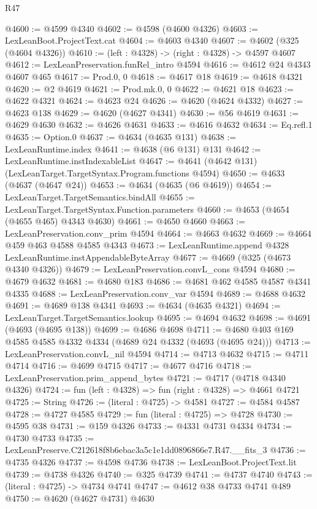 \begin{lexlean}{R47}
\begin{coremodule}
@4600 := @4599 @4340
@4602 := @4598 (@4600 @4326)
@4603 := LexLeanBoot.ProjectText.cat
@4604 := @4603 @4340
@4607 := @4602 (@325 (@4604 @4326))
@4610 := (left : @4328) -> (right : @4328) -> @4597 @4607
@4612 := LexLeanPreservation.funRel_intro @4594
@4616 := @4612 @24 @4343 @4607 @465
@4617 := Prod.{0, 0}
@4618 := @4617 @18
@4619 := @4618 @4321
@4620 := @2 @4619
@4621 := Prod.mk.{0, 0}
@4622 := @4621 @18
@4623 := @4622 @4321
@4624 := @4623 @24
@4626 := @4620 (@4624 @4332)
@4627 := @4623 @138
@4629 := @4620 (@4627 @4341)
@4630 := @56 @4619
@4631 := @4629 @4630
@4632 := @4626 @4631
@4633 := @4616 @4632
@4634 := Eq.refl.{1}
@4635 := Option.{0}
@4637 := @4634 (@4635 @131)
@4638 := LexLeanRuntime.index
@4641 := @4638 (@6 @131) @131
@4642 := LexLeanRuntime.instIndexableList
@4647 := @4641 (@4642 @131) (LexLeanTarget.TargetSyntax.Program.functions @4594)
@4650 := @4633 (@4637 (@4647 @24))
@4653 := @4634 (@4635 (@6 @4619))
@4654 := LexLeanTarget.TargetSemantics.bindAll
@4655 := LexLeanTarget.TargetSyntax.Function.parameters
@4660 := @4653 (@4654 (@4655 @465) @4343 @4630)
@4661 := @4650 @4660
@4663 := LexLeanPreservation.conv_prim @4594
@4664 := @4663 @4632
@4669 := @4664 @459 @463 @4588 @4585 @4343
@4673 := LexLeanRuntime.append @4328 LexLeanRuntime.instAppendableByteArray
@4677 := @4669 (@325 (@4673 @4340 @4326))
@4679 := LexLeanPreservation.convL_cons @4594
@4680 := @4679 @4632
@4681 := @4680 @183
@4686 := @4681 @462 @4585 @4587 @4341 @4335
@4688 := LexLeanPreservation.conv_var @4594
@4689 := @4688 @4632
@4691 := @4689 @138 @4341
@4693 := @4634 (@4635 @4321)
@4694 := LexLeanTarget.TargetSemantics.lookup
@4695 := @4694 @4632
@4698 := @4691 (@4693 (@4695 @138))
@4699 := @4686 @4698
@4711 := @4680 @403 @169 @4585 @4585 @4332 @4334 (@4689 @24 @4332 (@4693 (@4695 @24)))
@4713 := LexLeanPreservation.convL_nil @4594
@4714 := @4713 @4632
@4715 := @4711 @4714
@4716 := @4699 @4715
@4717 := @4677 @4716
@4718 := LexLeanPreservation.prim_append_bytes
@4721 := @4717 (@4718 @4340 @4326)
@4724 := fun (left : @4328) => fun (right : @4328) => @4661 @4721
@4725 := String
@4726 := (literal : @4725) -> @4581
@4727 := @4584 @4587
@4728 := @4727 @4585
@4729 := fun (literal : @4725) => @4728
@4730 := @4595 @38
@4731 := @159 @4326
@4733 := @4331 @4731 @4334
@4734 := @4730 @4733
@4735 := LexLeanPreserve.C212618f8b6ebac3a5c1e1dd0896866e7.R47.__fits_3
@4736 := @4735 @4326
@4737 := @4598 @4736
@4738 := LexLeanBoot.ProjectText.lit
@4739 := @4738 @4326
@4740 := @325 @4739
@4741 := @4737 @4740
@4743 := (literal : @4725) -> @4734 @4741
@4747 := @4612 @38 @4733 @4741 @489
@4750 := @4620 (@4627 @4731) @4630

\end{coremodule}
\end{lexlean}
